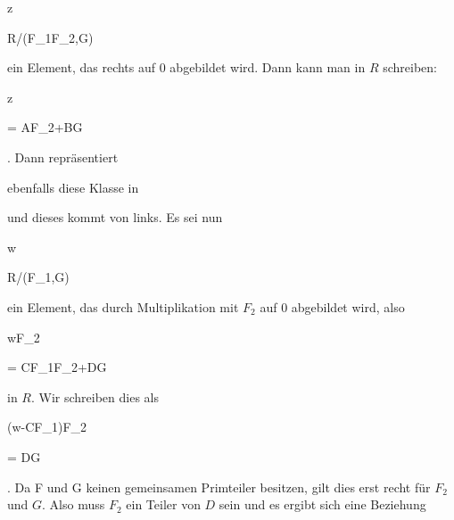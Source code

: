 {\mavergleichskette

{\vergleichskette

{ z
}

{ \in }{ R/(F_1F_2,G)
}

{  }{
}

{    }{
}

{   }{
}

}
{}{}{}
ein Element, das rechts auf $0$ abgebildet wird. Dann kann man in $R$ schreiben:


\mavergleichskette

{\vergleichskette

{ z
}

{ = }{ AF_2+BG
}

{  }{
}

{    }{
}

{   }{
}

}
{}{}{.}
Dann repräsentiert

 ebenfalls diese Klasse in

 und dieses kommt von links. Es sei nun


\mavergleichskette

{\vergleichskette

{ w
}

{ \in }{ R/(F_1,G)
}

{  }{
}

{    }{
}

{   }{
}

}
{}{}{}
ein Element, das durch Multiplikation mit $F_2$ auf $0$ abgebildet wird, also


\mavergleichskette

{\vergleichskette

{ wF_2
}

{ = }{ CF_1F_2+DG
}

{  }{
}

{    }{
}

{   }{
}

}
{}{}{}
in $R$. Wir schreiben dies als


\mavergleichskettedisp

{\vergleichskette

{ (w-CF_1)F_2
}

{ =} { DG
}

{ } {
}

{ } {
}

{ } {
}

}
{}{}{.}
Da
\mathkor {} {F} {und} {G} {}
keinen gemeinsamen Primteiler besitzen, gilt dies erst recht für $F_2$ und $G$. Also muss $F_2$ ein Teiler von $D$ sein und es ergibt sich eine Beziehung


}

